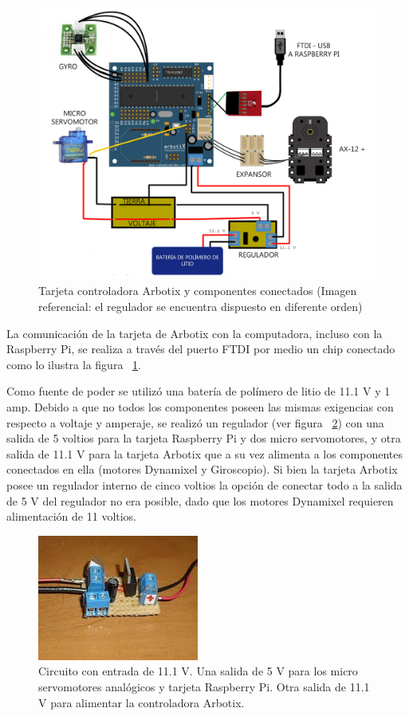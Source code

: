 \begin{figure}[hbtp]
\centering
\includegraphics[scale=0.2]{imagenes/arbotix_componentes1.jpg}
\caption{Tarjeta controladora Arbotix y componentes conectados (Imagen referencial: el regulador se encuentra dispuesto en diferente orden)}
\label{fig:arbotixConectados}
\end{figure}

La comunicación de la tarjeta de Arbotix con la computadora, incluso con la Raspberry Pi, se realiza a través del puerto FTDI por medio un chip conectado como lo ilustra la figura ~\ref{fig:arbotixConectados}.

Como fuente de poder se utilizó una batería de polímero de litio de 11.1 V y 1 amp. Debido a que no todos los componentes poseen las mismas exigencias con respecto a voltaje y amperaje, se realizó un regulador (ver figura ~\ref{fig:circuito}) con una salida de 5 voltios para la tarjeta Raspberry Pi y dos micro servomotores, y otra salida de 11.1 V para la tarjeta Arbotix que a su vez alimenta a los componentes conectados en ella (motores Dynamixel y Giroscopio). Si bien la tarjeta Arbotix posee un regulador interno de cinco voltios la opción de conectar todo a la salida de 5 V del regulador no era posible, dado que los motores Dynamixel requieren alimentación de 11 voltios.

\begin{figure}[hbtp]
\centering
\includegraphics[scale=0.5]{imagenes/circuito.jpg}
\caption{Circuito con entrada de 11.1 V. Una salida de 5 V para los micro servomotores anal\'ogicos y tarjeta Raspberry Pi. Otra salida de 11.1 V para alimentar la controladora Arbotix.}
\label{fig:circuito}
\end{figure}

